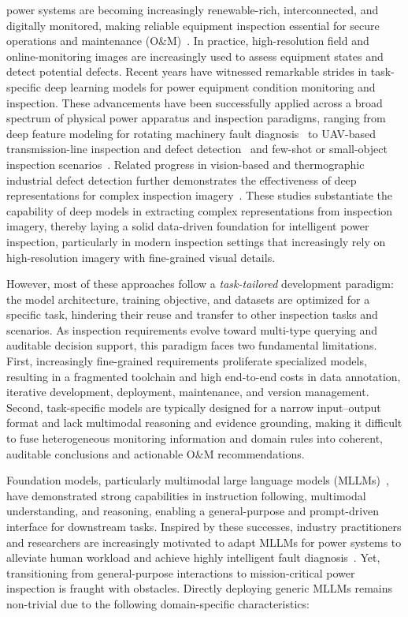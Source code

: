\documentclass[journal,twoside,web]{ieeecolor}
\begin{document}
 power systems are becoming increasingly renewable-rich, interconnected, and digitally monitored, making reliable equipment inspection essential for secure operations and maintenance (O\&M)~\cite{wang2020achieving}.
In practice, high-resolution field and online-monitoring images are increasingly used to assess equipment states and detect potential defects.
Recent years have witnessed remarkable strides in task-specific deep learning models for power equipment condition monitoring and inspection. These advancements have been successfully applied across a broad spectrum of physical power apparatus and inspection paradigms, ranging from deep feature modeling for rotating machinery fault diagnosis~\cite{lu2023rotating} to UAV-based transmission-line inspection and defect detection~\cite{xie2024power, nguyen2019intelligent, li2023cssadet, zhang2024hcvit, yi2025balancing} and few-shot or small-object inspection scenarios~\cite{dong2024transmission, zhang2025smallobject}. Related progress in vision-based and thermographic industrial defect detection further demonstrates the effectiveness of deep representations for complex inspection imagery~\cite{kang2019deep, gao2020multilevel, lema2022automated}. These studies substantiate the capability of deep models in extracting complex representations from inspection imagery, thereby laying a solid data-driven foundation for intelligent power inspection, particularly in modern inspection settings that increasingly rely on high-resolution imagery with fine-grained visual details.

However, most of these approaches follow a \emph{task-tailored} development paradigm: the model architecture, training objective, and datasets are optimized for a specific task, hindering their reuse and transfer to other inspection tasks and scenarios.
As inspection requirements evolve toward multi-type querying and auditable decision support, this paradigm faces two fundamental limitations.
First, increasingly fine-grained requirements proliferate specialized models, resulting in a fragmented toolchain and high end-to-end costs in data annotation, iterative development, deployment, maintenance, and version management.
Second, task-specific models are typically designed for a narrow input--output format and lack multimodal reasoning and evidence grounding, making it difficult to fuse heterogeneous monitoring information and domain rules into coherent, auditable conclusions and actionable O\&M recommendations.

Foundation models, particularly multimodal large language models (MLLMs)~\cite{flamingo, blip2, llava, internvl3}, have demonstrated strong capabilities in instruction following, multimodal understanding, and reasoning, enabling a general-purpose and prompt-driven interface for downstream tasks.
Inspired by these successes, industry practitioners and researchers are increasingly motivated to adapt MLLMs for power systems to alleviate human workload and achieve highly intelligent fault diagnosis~\cite{powerllava, pegpt}. Yet, transitioning from general-purpose interactions to mission-critical power inspection is fraught with obstacles. Directly deploying generic MLLMs remains non-trivial due to the following domain-specific characteristics:
\end{document}
